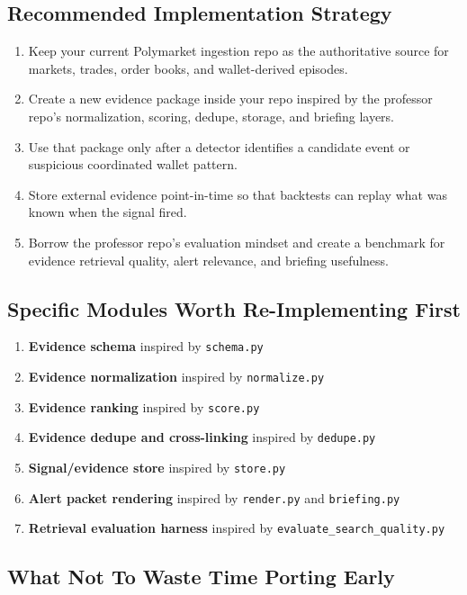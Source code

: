 \documentclass[11pt, letterpaper]{article}
\begin{document}
\subsection{Recommended Implementation Strategy}

\begin{enumerate}[nosep]
    \item Keep your current Polymarket ingestion repo as the authoritative source for markets, trades, order books, and wallet-derived episodes.
    \item Create a new evidence package inside your repo inspired by the professor repo's normalization, scoring, dedupe, storage, and briefing layers.
    \item Use that package only after a detector identifies a candidate event or suspicious coordinated wallet pattern.
    \item Store external evidence point-in-time so that backtests can replay what was known when the signal fired.
    \item Borrow the professor repo's evaluation mindset and create a benchmark for evidence retrieval quality, alert relevance, and briefing usefulness.
\end{enumerate}

\subsection{Specific Modules Worth Re-Implementing First}

\begin{enumerate}[nosep]
    \item \textbf{Evidence schema} inspired by \texttt{schema.py}
    \item \textbf{Evidence normalization} inspired by \texttt{normalize.py}
    \item \textbf{Evidence ranking} inspired by \texttt{score.py}
    \item \textbf{Evidence dedupe and cross-linking} inspired by \texttt{dedupe.py}
    \item \textbf{Signal/evidence store} inspired by \texttt{store.py}
    \item \textbf{Alert packet rendering} inspired by \texttt{render.py} and \texttt{briefing.py}
    \item \textbf{Retrieval evaluation harness} inspired by \texttt{evaluate\_search\_quality.py}
\end{enumerate}

\subsection{What Not To Waste Time Porting Early}
\end{document}
